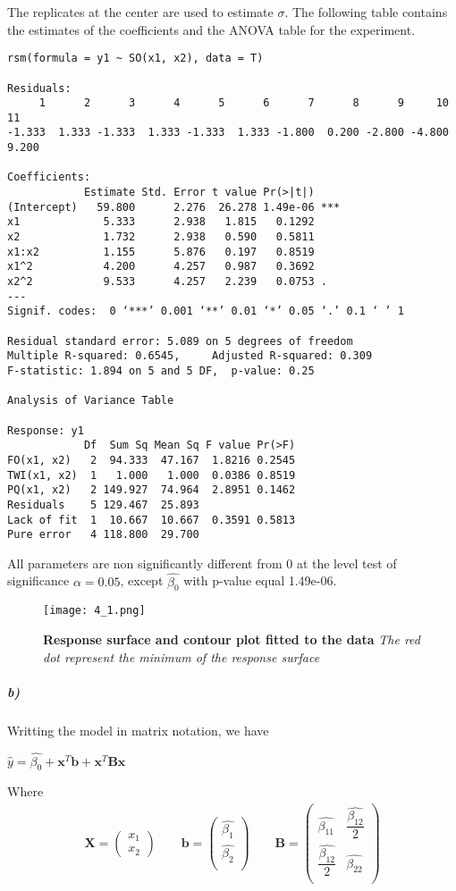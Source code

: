 \documentclass{article}
\begin{document}
The replicates at the center are used to estimate $\sigma$. The following table contains the estimates of the coefficients and the ANOVA table for the experiment.
\begin{small}
\begin{verbatim}
rsm(formula = y1 ~ SO(x1, x2), data = T)

Residuals:
     1      2      3      4      5      6      7      8      9     10     11 
-1.333  1.333 -1.333  1.333 -1.333  1.333 -1.800  0.200 -2.800 -4.800  9.200 

Coefficients:
            Estimate Std. Error t value Pr(>|t|)    
(Intercept)   59.800      2.276  26.278 1.49e-06 ***
x1             5.333      2.938   1.815   0.1292    
x2             1.732      2.938   0.590   0.5811    
x1:x2          1.155      5.876   0.197   0.8519    
x1^2           4.200      4.257   0.987   0.3692    
x2^2           9.533      4.257   2.239   0.0753 .  
---
Signif. codes:  0 ‘***’ 0.001 ‘**’ 0.01 ‘*’ 0.05 ‘.’ 0.1 ‘ ’ 1 

Residual standard error: 5.089 on 5 degrees of freedom
Multiple R-squared: 0.6545,     Adjusted R-squared: 0.309 
F-statistic: 1.894 on 5 and 5 DF,  p-value: 0.25 

Analysis of Variance Table

Response: y1
            Df  Sum Sq Mean Sq F value Pr(>F)
FO(x1, x2)   2  94.333  47.167  1.8216 0.2545
TWI(x1, x2)  1   1.000   1.000  0.0386 0.8519
PQ(x1, x2)   2 149.927  74.964  2.8951 0.1462
Residuals    5 129.467  25.893               
Lack of fit  1  10.667  10.667  0.3591 0.5813
Pure error   4 118.800  29.700
\end{verbatim}
\end{small} 
All parameters are non significantly different from 0 at the level test of significance $\alpha=0.05$, except $\widehat{\beta_0}$ with p-value equal 1.49e-06.
\begin{figure}[H]
	  \centering
  	\texttt{[image: 4\_1.png]}
  	\caption{\textbf{Response surface and contour plot fitted to the data} \textsl{The red dot represent the minimum of the response surface}
  	}
	\end{figure} 
\subparagraph{b)}
Writting the model in matrix notation, we have
\begin{center}
$\widehat{y}=\widehat{\beta_0}+\pmb{x}^T\pmb{b} +\pmb{x}^T\pmb{B}\pmb{x}$
\end{center}
Where
\begin{align*}
\pmb{X}=
\begin{pmatrix}
x_1 \\
x_2
\end{pmatrix}
\qquad
\pmb{b}=
\begin{pmatrix}
\widehat{\beta_1} \\
\widehat{\beta_2} \\
\end{pmatrix}
\qquad
\pmb{B}=
\begin{pmatrix}
\widehat{\beta_{11}} & \dfrac{\widehat{\beta_{12}}}{2} \\
\dfrac{\widehat{\beta_{12}}}{2} & \widehat{\beta_{22}} \\
\end{pmatrix}
\end{align*}
\end{document}
